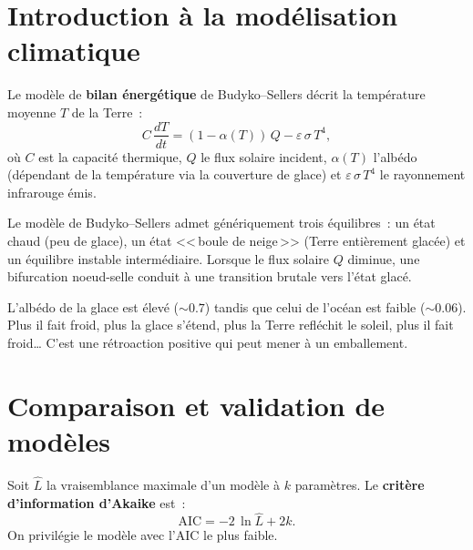 \section{Introduction \`a la mod\'elisation climatique}
\label{sec:climat}

\begin{definition}
Le mod\`ele de \textbf{bilan \'energ\'etique} de Budyko--Sellers
d\'ecrit la temp\'erature moyenne $T$ de la Terre~:
\[
  C\,\frac{dT}{dt} = (1 - \alpha(T))\, Q - \varepsilon\,\sigma\, T^4,
\]
o\`u $C$ est la capacit\'e thermique, $Q$ le flux solaire incident,
$\alpha(T)$ l'alb\'edo (d\'ependant de la temp\'erature via la couverture
de glace) et $\varepsilon\,\sigma\,T^4$ le rayonnement infrarouge \'emis.
\end{definition}

\begin{theoreme}
Le mod\`ele de Budyko--Sellers admet g\'en\'eriquement trois \'equilibres~:
un \'etat chaud (peu de glace), un \'etat <<\,boule de neige\,>>
(Terre enti\`erement glac\'ee) et un \'equilibre instable interm\'ediaire.
Lorsque le flux solaire $Q$ diminue, une bifurcation noeud-selle
conduit \`a une transition brutale vers l'\'etat glac\'e.
\end{theoreme}

\begin{intuition}
L'alb\'edo de la glace est \'elev\'e ($\sim 0.7$) tandis que celui de
l'oc\'ean est faible ($\sim 0.06$). Plus il fait froid, plus la glace
s'\'etend, plus la Terre refl\'echit le soleil, plus il fait froid\ldots{}
C'est une r\'etroaction positive qui peut mener \`a un emballement.
\end{intuition}

\section{Comparaison et validation de mod\`eles}
\label{sec:validation}

\begin{definition}
Soit $\hat{L}$ la vraisemblance maximale d'un mod\`ele \`a $k$ param\`etres.
Le \textbf{crit\`ere d'information d'Akaike} est~:
\[
  \text{AIC} = -2\,\ln \hat{L} + 2k.
\]
On privil\'egie le mod\`ele avec l'AIC le plus faible.
\end{definition}

